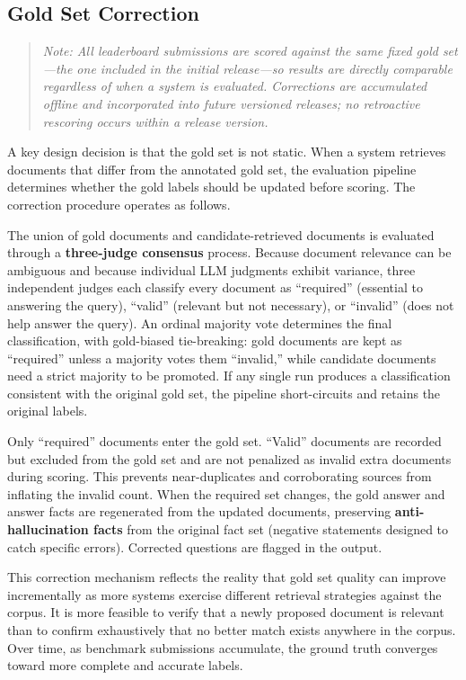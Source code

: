 \documentclass{article}
\begin{document}
\subsection{Gold Set Correction}
\label{sec:correction}

\begin{quote}
\textit{Note: All leaderboard submissions are scored against the same fixed gold set---the one included in the initial release---so results are directly comparable regardless of when a system is evaluated. Corrections are accumulated offline and incorporated into future versioned releases; no retroactive rescoring occurs within a release version.}
\end{quote}

A key design decision is that the gold set is not static. When a system retrieves documents that differ from the annotated gold set, the evaluation pipeline determines whether the gold labels should be updated before scoring. The correction procedure operates as follows.

The union of gold documents and candidate-retrieved documents is evaluated through a \textbf{three-judge consensus} process. Because document relevance can be ambiguous and because individual LLM judgments exhibit variance, three independent judges each classify every document as ``required'' (essential to answering the query), ``valid'' (relevant but not necessary), or ``invalid'' (does not help answer the query). An ordinal majority vote determines the final classification, with gold-biased tie-breaking: gold documents are kept as ``required'' unless a majority votes them ``invalid,'' while candidate documents need a strict majority to be promoted. If any single run produces a classification consistent with the original gold set, the pipeline short-circuits and retains the original labels.

Only ``required'' documents enter the gold set. ``Valid'' documents are recorded but excluded from the gold set and are not penalized as invalid extra documents during scoring. This prevents near-duplicates and corroborating sources from inflating the invalid count. When the required set changes, the gold answer and answer facts are regenerated from the updated documents, preserving \textbf{anti-hallucination facts} from the original fact set (negative statements designed to catch specific errors). Corrected questions are flagged in the output.

This correction mechanism reflects the reality that gold set quality can improve incrementally as more systems exercise different retrieval strategies against the corpus. It is more feasible to verify that a newly proposed document is relevant than to confirm exhaustively that no better match exists anywhere in the corpus. Over time, as benchmark submissions accumulate, the ground truth converges toward more complete and accurate labels.
\end{document}
